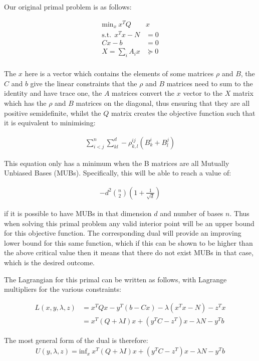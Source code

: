 \documentclass{article}
\begin{document}
Our original primal problem is as follows:

\begin{align}
	\text{min}_{x} ~ x^T Q &x \\
	\text{s.t.} ~~ x^T x - N &= 0 \\
	Cx - b &= 0 \\
	X = \sum_i A_i x &\succeq 0 \\
\end{align}

The $x$ here is a vector which contains the elements of some matrices $\rho$ and $B$, the $C$ and $b$ give the linear constraints that the $\rho$ and $B$ matrices need to sum to the identity and have trace one, the $A$ matrices convert the $x$ vector to the $X$ matrix which has the $\rho$ and $B$ matrices on the diagonal, thus ensuring that they are all positive semidefinite, whilst the $Q$ matrix creates the objective function such that it is equivalent to minimising:

\begin{align}
	\sum_{i<j}^n \sum_{kl}^d -\rho_{k,l}^{ij} (B_k^i + B_l^j)
\end{align}

This equation only has a minimum when the B matrices are all Mutually Unbiased Bases (MUBs). Specifically, this will be able to reach a value of:

\begin{align}
	-d^2 \binom{n}{2} \left(1+\frac{1}{\sqrt{d}}\right)
\end{align}

if it is possible to have MUBs in that dimension $d$ and number of bases $n$.  Thus when solving this primal problem any valid interior point will be an upper bound for this objective function. The corresponding dual will provide an improving lower bound for this same function, which if this can be shown to be higher than the above critical value then it means that there do not exist MUBs in that case, which is the desired outcome.

The Lagrangian for this primal can be written as follows, with Lagrange multipliers for the various constraints:

\begin{align}
	L(x, y, \lambda, z) &= x^T Q x - y^T (b-Cx) - \lambda (x^T x - N) - z^T x \\ 
						&= x^T ( Q + \lambda I) x + (y^TC - z^T) x - \lambda N - y^T b
\end{align}

The most general form of the dual is therefore:
\begin{align}
	U(y, \lambda, z) = \text{inf}_{x} ~  x^T ( Q + \lambda I) x + (y^TC - z^T) x - \lambda N - y^T b
\end{align}
\end{document}

